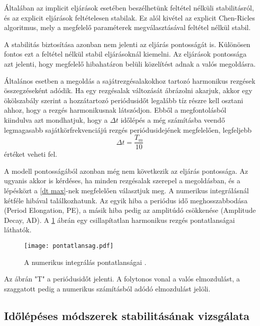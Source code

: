 Általában az implicit eljárások esetében beszélhetünk feltétel nélküli stabilitásról, és az explicit eljárások feltételesen stabilak. Ez alól kivétel az explicit Chen-Ricles  algoritmus, mely a megfelelő paraméterek megválasztásával feltétel nélkül stabil.

A stabilitás biztosítása azonban nem jelenti az eljárás pontosságát is. Különösen fontos ezt a feltétel nélkül stabil eljárásoknál kiemelni.  Az eljárások pontossága azt jelenti, hogy megfelelő hibahatáron belüli közelítést adnak a valós megoldásra.

Általános esetben a megoldás a sajátrezgésalakokhoz tartozó harmonikus rezgések összegzéseként adódik. Ha egy rezgésalak változását ábrázolni akarjuk, akkor egy ökölszabály szerint a hozzátartozó periódusidőt  legalább tíz részre kell osztani ahhoz, hogy a rezgés  harmonikusnak látszódjon. Ebből a megfontolásból kiindulva azt mondhatjuk, hogy a $\Delta{t}$ időlépés a még számításba veendő legmagasabb sajátkörfrekvenciájú rezgés periódusidejének megfelelően, legfeljebb 
%
\begin{equation}
\label{dt max}
\Delta{t} = \frac{T_m}{10}
\end{equation}
% 
értéket veheti fel. 



A modell pontosságából azonban még nem következik az eljárás pontossága. Az ugyanis akkor is kérdéses, ha minden rezgésalak szerepel a megoldásban, és a lépésközt a \eqref{dt max}-nek megfelelően választjuk meg. A numerikus integrálásnál kétféle hibával találkozhatunk. Az egyik hiba a periódus idő meghosszabbodása (Period Elongation, PE), a másik hiba pedig az amplitúdó csökkenése (Amplitude Decay, AD). A \ref{fig:pont} ábrán egy csillapítatlan harmonikus rezgés pontatlanságai láthatók.

  \begin{figure}[h!]
\centering
\texttt{[image: pontatlansag.pdf]}
\caption{A numerikus integrálás pontatlanságai \cite{gyorgyi}.}
\label{fig:pont}
\end{figure}
 
Az ábrán "T" a periódusidőt jelenti. A folytonos vonal a valós elmozdulást, a szaggatott pedig a numerikus számításból adódó elmozdulást  jelöli.


\subsection{Időlépéses módszerek stabilitásának vizsgálata}

